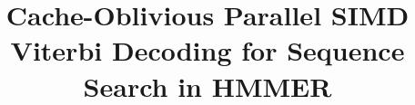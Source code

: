 \documentclass{bmcart}
\begin{document}

\begin{frontmatter}

\begin{fmbox}



\title{Cache-Oblivious Parallel SIMD Viterbi Decoding for \mbox{Sequence} Search in HMMER}
 

\author[
   addressref={aff1},                   %
   email={miguel.ferreira@tecnico.ulisboa.pt}   %
]{ }
\author[
   addressref={aff1,aff2},
   email={nuno.roma@inesc-id.pt}
]{ }
\author[
   addressref={aff1,aff2},
   corref={aff1,aff2},                       %
   noteref={n1},                        %
   email={lsr@kdbio.inesc-id.pt}
]{ }




\end{fmbox}
\end{frontmatter}
\end{document}
